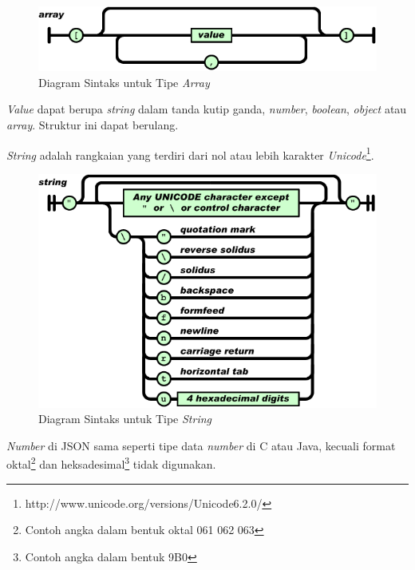 \documentclass[a4paper, 12pt, oneside]{report}
\begin{document}
\begin{figure}[htp]
\centering
\includegraphics[scale=0.55]{images/array-json.png}
\caption{Diagram Sintaks untuk Tipe \textit{Array} \cite{json-fat-free}}
\label{Diagram Sintaks untuk Tipe Array}
\end{figure}

\onehalfspacing \textit{Value} dapat berupa \textit{string} dalam tanda kutip ganda, \textit{number}, \textit{boolean}, \textit{object} atau \textit{array}. Struktur ini dapat berulang.

\onehalfspacing \textit{String} adalah rangkaian yang terdiri dari nol atau lebih karakter \textit{Unicode}\footnote{http://www.unicode.org/versions/Unicode6.2.0/}.

\begin{figure}[htp]
\centering
\includegraphics[scale=0.55]{images/string-json.png}
\caption{Diagram Sintaks untuk Tipe \textit{String} \cite{json-fat-free}}
\label{Diagram Sintaks untuk Tipe String}
\end{figure}

\onehalfspacing \textit{Number} di JSON sama seperti tipe data \textit{number} di C atau Java, kecuali format oktal\footnote{Contoh angka dalam bentuk oktal 061 062 063} dan heksadesimal\footnote{Contoh angka dalam bentuk 9B0} tidak digunakan.
\end{document}
